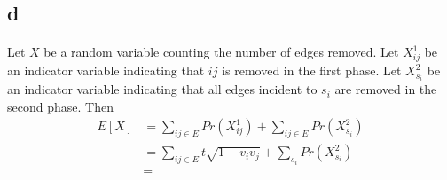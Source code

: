\documentclass[letterpaper,12pt,oneside,onecolumn]{article}
\begin{document}
\subsection{d}
\paragraph{}
Let $X$ be a random variable counting the number of edges removed. Let $X_{ij}^1$ be an indicator variable indicating that $ij$ is removed in the first phase. Let $X_{s_i}^2$ be an indicator variable indicating that all edges incident to $s_i$ are removed in the second phase.
Then 
\begin{align*}
E[X] &= \sum_{ij \in E} Pr(X^1_{ij}) + \sum_{ij\in E} Pr(X^2_{s_i}) \\
&= \sum_{ij \in E} t\sqrt{1-v_iv_j} + \sum_{s_i} Pr(X^2_{s_i}) \\
&=
\end{align*}
\end{document}

